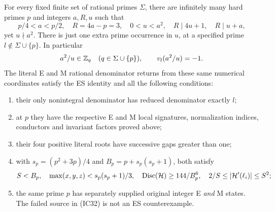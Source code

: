 \begin{theorem}\label{thm:controls}
For every fixed finite set of rational primes $\Sigma$, there are infinitely
many hard primes $p$ and integers $a,R,u$ such that
\[
 p/4<a<p/2,\quad R=4a-p=3,\quad0<u<a^2,
 \quad R\mid4u+1,\quad R\mid u+a,                       \tag{IC32}
\]
yet $u\nmid a^2$. There is just one extra prime occurrence in $u$, at a
specified prime $l\notin\Sigma\cup\{p\}$. In particular
\[
 a^2/u\in\mathbb Z_q\quad(q\in\Sigma\cup\{p\}),
 \qquad v_l(a^2/u)=-1.
\]
The literal E and M rational denominator returns from these same numerical
coordinates satisfy the ES identity and all the following conditions:
\begin{enumerate}
\item their only nonintegral denominator has reduced denominator exactly $l$;
\item at $p$ they have the respective E and M local signatures, normalization
indices, conductors and invariant factors proved above;
\item their four positive literal roots have successive gaps greater than one;
\item with $s_p=(p^2+3p)/4$ and $B_p=p+s_p(s_p+1)$, both satisfy
\[
 S<B_p,\quad\max(x,y,z)<s_p(s_p+1)/3,\quad
 \operatorname{Disc}(\mathcal H)\ge144/B_p^6,\quad
 2/S\le|\mathcal H'(\ell_i)|\le S^2;
\]
\item the same prime $p$ has separately supplied original integer E \emph{and}
M states. The failed source in (IC32) is not an ES counterexample.
\end{enumerate}
\end{theorem}
